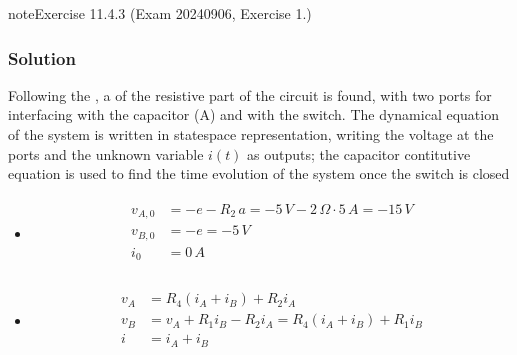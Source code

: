 \documentclass[letterpaper,10pt,english]{jupyterBook}
\begin{document}
\begin{sphinxadmonition}{note}{Exercise 11.4.3 (Exam 2024\sphinxhyphen{}09\sphinxhyphen{}06, Exercise 1.)}



\begin{figure}[htbp]
\centering

\noindent{}
\end{figure}
\subsubsection*{Solution}

\sphinxAtStartPar
{} Following the , a {\hyperref[\detokenize{ch/electrical-engineering-networks-linear:classical-electromagnetism-electrical-engineering-newtork-analysis-thevenin-n-port}]{}} of the resistive part of the circuit is found, with two ports for interfacing with the capacitor (A) and with the switch. The dynamical equation of the system is written in state\sphinxhyphen{}space representation, writing the voltage at the ports and the unknown variable \(i(t)\) as outputs; the capacitor contitutive equation is used to find the time evolution of the system once the switch is closed
\begin{itemize}
\item {} 
\sphinxAtStartPar
{}
\begin{equation*}
\begin{split}\begin{aligned}
     v_{A,0} & = - e - R_2 \, a = - 5 \, V - 2 \, \Omega \cdot 5 \, A = - 15 \, V \\
     v_{B,0} & = - e = - 5 \, V \\
     i_{0}   & = 0 \, A \\
   \end{aligned}\end{split}
\end{equation*}
\item {} 
\sphinxAtStartPar
{}
\begin{equation*}
\begin{split}\begin{aligned}
     v_A & = R_4 (i_A+i_B) + R_2 i_A \\
     v_B & = v_A + R_1 i_B - R_2 i_A = R_4 (i_A + i_B) + R_1 i_B \\
     i   & = i_A + i_B \\
   \end{aligned}\end{split}
\end{equation*}
\end{itemize}


\end{sphinxadmonition}
\end{document}
